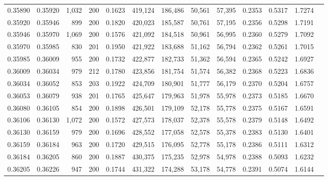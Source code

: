 \begin{tabular}{rrrrrrrrrrrrr}
0.35890 & 0.35920 & 1,032 & 200 &                                     0.1623 & 419,124 & 186,486 &  50,561 &  57,395 & 0.2353 & 0.5317 & 1.7274 \\
0.35920 & 0.35946 &   899 & 200 &                                     0.1820 & 420,023 & 185,587 &  50,761 &  57,195 & 0.2356 & 0.5298 & 1.7191 \\
0.35946 & 0.35970 & 1,069 & 200 &                                     0.1576 & 421,092 & 184,518 &  50,961 &  56,995 & 0.2360 & 0.5279 & 1.7092 \\
0.35970 & 0.35985 &   830 & 201 &                                     0.1950 & 421,922 & 183,688 &  51,162 &  56,794 & 0.2362 & 0.5261 & 1.7015 \\
0.35985 & 0.36009 &   955 & 200 &                                     0.1732 & 422,877 & 182,733 &  51,362 &  56,594 & 0.2365 & 0.5242 & 1.6927 \\
0.36009 & 0.36034 &   979 & 212 &                                     0.1780 & 423,856 & 181,754 &  51,574 &  56,382 & 0.2368 & 0.5223 & 1.6836 \\
0.36034 & 0.36052 &   853 & 203 &                                     0.1922 & 424,709 & 180,901 &  51,777 &  56,179 & 0.2370 & 0.5204 & 1.6757 \\
0.36053 & 0.36079 &   938 & 201 &                                     0.1765 & 425,647 & 179,963 &  51,978 &  55,978 & 0.2373 & 0.5185 & 1.6670 \\
0.36080 & 0.36105 &   854 & 200 &                                     0.1898 & 426,501 & 179,109 &  52,178 &  55,778 & 0.2375 & 0.5167 & 1.6591 \\
0.36106 & 0.36130 & 1,072 & 200 &                                     0.1572 & 427,573 & 178,037 &  52,378 &  55,578 & 0.2379 & 0.5148 & 1.6492 \\
0.36130 & 0.36159 &   979 & 200 &                                     0.1696 & 428,552 & 177,058 &  52,578 &  55,378 & 0.2383 & 0.5130 & 1.6401 \\
0.36159 & 0.36184 &   963 & 200 &                                     0.1720 & 429,515 & 176,095 &  52,778 &  55,178 & 0.2386 & 0.5111 & 1.6312 \\
0.36184 & 0.36205 &   860 & 200 &                                     0.1887 & 430,375 & 175,235 &  52,978 &  54,978 & 0.2388 & 0.5093 & 1.6232 \\
0.36205 & 0.36226 &   947 & 200 &                                     0.1744 & 431,322 & 174,288 &  53,178 &  54,778 & 0.2391 & 0.5074 & 1.6144 \\

\end{tabular}
